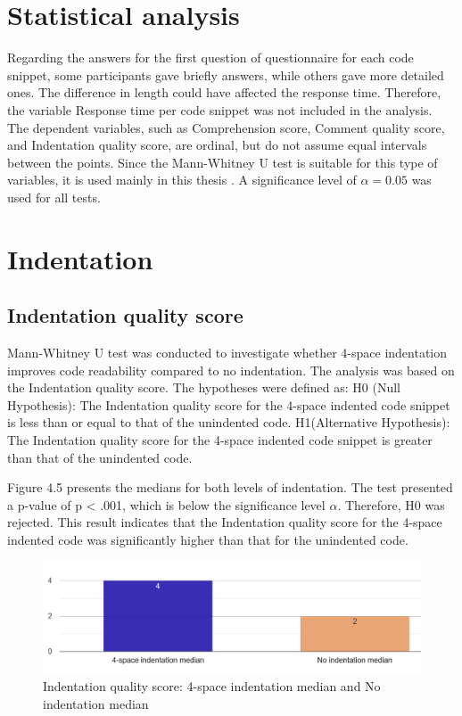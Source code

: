\section{Statistical analysis}

Regarding the answers for the first question of questionnaire for each code snippet, some participants gave briefly answers, while others gave more detailed ones. The difference in length could have affected the response time. Therefore, the variable Response time per code snippet was not included in the analysis. The dependent variables, such as Comprehension score, Comment quality score, and Indentation quality score, are ordinal, but do not assume equal intervals between the points.
Since the Mann-Whitney U test is suitable for this type of variables, it is used mainly in this thesis \cite{MacFarland2016}.
A significance level of \(\alpha = 0.05\) was used for all tests.

\section{Indentation}

\subsection{Indentation quality score}


Mann-Whitney U test was conducted to investigate whether 4-space indentation improves code readability compared to no indentation. The analysis was based on the Indentation quality score. The hypotheses were defined as:  H0 (Null Hypothesis): The Indentation quality score for the 4-space indented code snippet is less than or equal to that of the unindented code. H1(Alternative Hypothesis): The Indentation quality score for the 4-space indented code snippet is greater than that of the unindented code.

Figure 4.5 presents the medians for both levels of indentation. The test presented a p-value of p < .001, which is below the significance level \(\alpha\). Therefore, H0 was rejected. This result indicates that the Indentation quality score for the 4-space indented code was significantly higher than that for the unindented code. 

\begin{figure} [H]
  \centering
  \includegraphics[scale=0.6]{figures/4-0-q5png.png}
  \caption{Indentation quality score: 4-space indentation median and No indentation median}
  \label{fig:AnhangsChor}
\end{figure}


